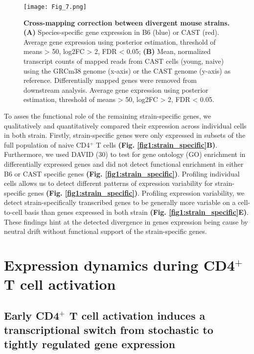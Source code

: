 \begin{figure}[!hb]
\centering
\texttt{[image: Fig\_7.png]}
\caption[Cross-mapping correction between divergent mouse strains]{\textbf{Cross-mapping correction between divergent mouse strains.}\\
\textbf{(A)} Species-specific gene expression in B6 (blue) or CAST (red). Average gene expression using posterior estimation, threshold of means > 50, log2FC > 2, FDR < 0.05; \textbf{(B)} Mean, normalized transcript counts of mapped reads from CAST cells (young, naive) using the GRCm38 genome (x-axis) or the CAST genome (y-axis) as reference. Differentially mapped genes were removed from downstream analysis. Average gene expression using posterior estimation, threshold of means > 50, log2FC > 2, FDR < 0.05.
}
\label{fig1:spec_spec_mapping}
\end{figure}

To asses the functional role of the remaining strain-specific genes, we qualitatively and quantitatively compared their expression across individual cells in both strain. Firstly, strain-specific genes were only expressed in subsets of the full population of naive CD4$^+$ T cells \textbf{(Fig. \ref{fig1:strain_specific}B)}. Furthermore, we used DAVID (30) to test for gene ontology (GO) enrichment in differentially expressed genes and did not detect functional enrichment in either B6 or CAST specific genes \textbf{(Fig. \ref{fig1:strain_specific})}. Profiling individual cells allows us to detect different patterns of expression variability for strain-specific genes \textbf{(Fig. \ref{fig1:strain_specific})}. Profiling expression variability, we detect strain-specifically transcribed genes to be generally more variable on a cell-to-cell basis than genes expressed in both strain \textbf{(Fig. \ref{fig1:strain_specific}E)}. These findings hint at the detected divergence in genes expression being cause by neutral drift without functional support of the strain-specific genes.

\section{Expression dynamics during CD4$^+$ T cell activation}
\subsection*{Early CD4$^+$ T cell activation induces a transcriptional switch from stochastic to tightly regulated gene expression} \label{sec1:Tcell_activation}

